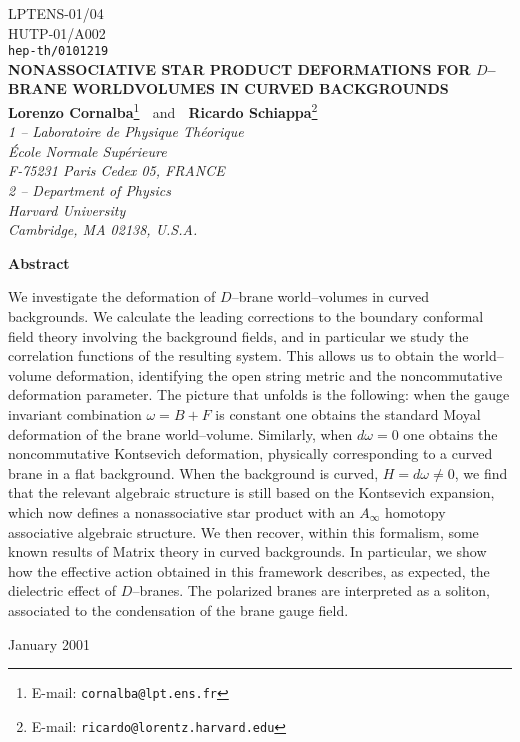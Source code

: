 \documentclass[a4paper,11pt]{article}
\newcommand{\vs}[1]{\vspace{#1 mm}}
\begin{document}
\begin{titlepage}
\begin{center}

\hfill  {LPTENS-01/04} \\
\hfill  {HUTP-01/A002} \\
\hfill  {\tt hep-th/0101219} \\
        [.3in]

{\large\bf
NONASSOCIATIVE STAR PRODUCT DEFORMATIONS FOR $D$--BRANE WORLDVOLUMES IN
CURVED BACKGROUNDS
}\\[.3in]

{\bf Lorenzo Cornalba}\footnote{E-mail: {\tt cornalba@lpt.ens.fr}}
$\;$ and $\;$
{\bf Ricardo Schiappa}\footnote{E-mail: {\tt ricardo@lorentz.harvard.edu}}\\

\vs{4}
{\it 1 -- Laboratoire de Physique Th\'eorique}\\
{\it \'Ecole Normale Sup\'erieure}\\
{\it F-75231 Paris Cedex 05, FRANCE}\\
\vs{2}
{\it 2 -- Department of Physics}\\
{\it Harvard University}\\
{\it Cambridge, MA 02138, U.S.A.}\\

\end{center}

\vs{1}
\centerline{{\bf{Abstract}}}
\vs{1}

\small{
\noindent
We investigate the deformation of $D$--brane world--volumes in curved
backgrounds. We calculate the leading corrections to the boundary conformal
field theory involving the background fields, and in particular we study
the correlation functions of the resulting system. This allows us to obtain
the world--volume deformation, identifying the open string metric and the
noncommutative deformation parameter. The picture that unfolds is the
following: when the gauge invariant combination $\omega = B + F$ is
constant one obtains the standard Moyal deformation of the brane
world--volume. Similarly, when $d\omega = 0$ one obtains the noncommutative
Kontsevich deformation, physically corresponding to a curved brane in a
flat background.  When the background is curved, $H = d\omega \not = 0$, we
find that the relevant algebraic structure is still based on the Kontsevich
expansion, which now defines a nonassociative star product with an 
$A_{\infty}$ homotopy associative algebraic structure. We then
recover, within this formalism, some known results of Matrix theory in
curved backgrounds. In particular, we show how the effective action
obtained in this framework describes, as expected, the dielectric effect of
$D$--branes. The polarized branes are interpreted as a soliton, associated
to the condensation of the brane gauge field.
}

\vs{2}

\noindent
\hfill January 2001

\end{titlepage}
\end{document}
